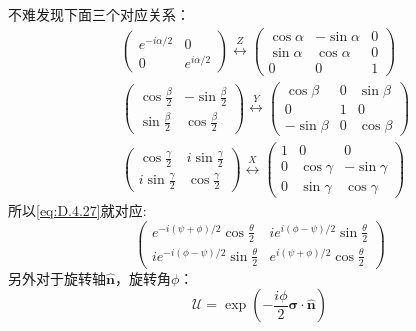 不难发现下面三个对应关系：
\begin{equation}
	\begin{aligned}
		&\left( {\begin{array}{*{20}{c}}
				{{e^{ - i\alpha /2}}}&0 \\ 
				0&{{e^{i\alpha /2}}} 
		\end{array}} \right)\overset Z \longleftrightarrow \left( {\begin{array}{*{20}{c}}
				{\cos \alpha }&{ - \sin \alpha }&0 \\ 
				{\sin \alpha }&{\cos \alpha }&0 \\ 
				0&0&1 
		\end{array}} \right)\\
		&\left( {\begin{array}{*{20}{c}}
				{\cos \frac{\beta }{2}}&{ - \sin \frac{\beta }{2}} \\ 
				{\sin \frac{\beta }{2}}&{\cos \frac{\beta }{2}} 
		\end{array}} \right)\overset Y \longleftrightarrow \left( {\begin{array}{*{20}{c}}
				{\cos \beta }&0&{\sin \beta } \\ 
				0&1&0 \\ 
				{ - \sin \beta }&0&{\cos \beta } 
		\end{array}} \right)\\
		&\left( {\begin{array}{*{20}{c}}
				{\cos \frac{\gamma }{2}}&{i\sin \frac{\gamma }{2}} \\ 
				{i\sin \frac{\gamma }{2}}&{\cos \frac{\gamma }{2}} 
		\end{array}} \right)\overset X \longleftrightarrow \left( {\begin{array}{*{20}{c}}
				1&0&0 \\ 
				0&{\cos \gamma }&{ - \sin \gamma } \\ 
				0&{\sin \gamma }&{\cos \gamma } 
		\end{array}} \right)
	\end{aligned}
\end{equation}
所以\ref{eq:D.4.27}就对应:
\[\left( {\begin{array}{*{20}{c}}
		{{e^{ - i\left( {\psi  + \phi } \right)/2}}\cos \frac{\theta }{2}}&{i{e^{i\left( {\phi  - \psi } \right)/2}}\sin \frac{\theta }{2}} \\ 
		{i{e^{ - i\left( {\phi  - \psi } \right)/2}}\sin \frac{\theta }{2}}&{{e^{i\left( {\psi  + \phi } \right)/2}}\cos \frac{\theta }{2}} 
\end{array}} \right)\]
另外对于旋转轴$\hat{\mathbf{n}}$，旋转角$\phi$：
\[
	\mathcal{U}=\exp\left(-\frac{i\phi}{2}\mathbf{\sigma}\cdot\hat{\mathbf{n}}\right)
\]

